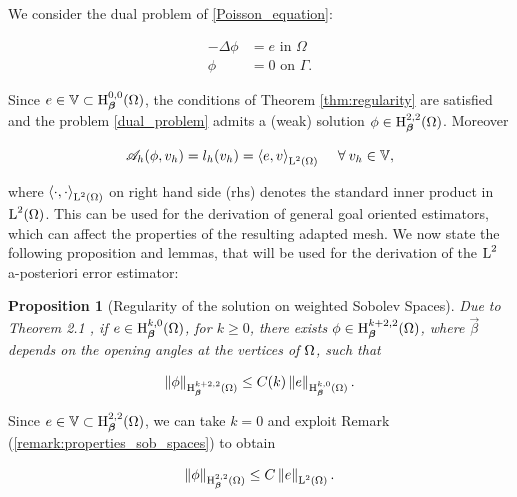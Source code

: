 \documentclass[a4paper,11pt]{article}
\newtheorem{props}[theorem]{Proposition}
\begin{document}
{We consider the dual problem of \eqref{Poisson_equation}:

\begin{equation} \label{dual_problem}
\begin{split}
    - \Delta \phi &= e  \text{ in } \Omega \\
    \phi &= 0  \text{ on } \Gamma.
\end{split}
\end{equation}

Since $e \in \mathbb V \subset \operatorname H^{0,0}_{\boldsymbol \beta}(\Omega)$, the conditions of Theorem \ref{thm:regularity} are satisfied and the problem \eqref{dual_problem} admits a (weak) solution $\phi \in \operatorname H^{2,2}_{\boldsymbol \beta}(\Omega)$. Moreover

\begin{equation}\label{dual_problem_weak}
  \mathscr A_{h}(\phi,v_{h}) = l_{h}(v_{h}) = \left\langle{e,v}\right\rangle_{\operatorname L^{2}(\Omega)} \quad\:\forall\: v_{h} \in \mathbb V,
\end{equation}

where $\left\langle{\cdot,\cdot}\right\rangle_{\operatorname L^{2}(\Omega)}$ on right hand side (rhs) denotes the standard inner product in $\operatorname L^{2}(\Omega)$. This can be used for the derivation of general goal oriented estimators, which can affect the properties of the resulting adapted mesh. We now state the following proposition and lemmas, that will be used for the derivation of the $\operatorname L^{2}$ a-posteriori error estimator:

\begin{props}[Regularity of the solution on weighted Sobolev Spaces]
\label{prop:regularity_dual}
Due to Theorem 2.1 \cite{BG:1988}, if $e \in \operatorname H^{k,0}_{\boldsymbol \beta}(\Omega)$, for $k\geq 0$, there exists $\phi \in \operatorname H^{k+2,2}_{\boldsymbol \beta}(\Omega)$, where $\vec{\beta}$ depends on the opening angles at the vertices of $\Omega$, such that 

\begin{equation}
    \left\|\phi\right\|_{\operatorname H^{k+2,2}_{\boldsymbol \beta}(\Omega)} \leq  C(k) \left\|e\right\|_{\operatorname H^{k,0}_{\boldsymbol \beta}(\Omega)}.
\label{eq:regularity-dual-problem}
\end{equation}
\end{props}

Since $e \in \mathbb V \subset \operatorname H^{2,2}_{\boldsymbol \beta}(\Omega)$, we can take $k = 0$ and exploit Remark (\ref{remark:properties_sob_spaces}) to obtain 

\begin{equation}
    \left\|\phi\right\|_{\operatorname H^{2,2}_{\boldsymbol \beta}(\Omega)} \leq  C \left\|e\right\|_{\operatorname L^{2}(\Omega)}.
\label{eq:regularity_inequality}
\end{equation}

}
\end{document}

